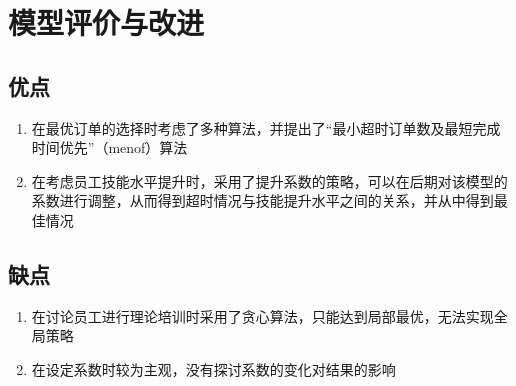 \newpage
\section{模型评价与改进}
\subsection{优点}
\begin{enumerate}
    \item 在最优订单的选择时考虑了多种算法，并提出了“最小超时订单数及最短完成时间优先”（menof）算法

    \item 在考虑员工技能水平提升时，采用了提升系数的策略，可以在后期对该模型的系数进行调整，从而得到超时情况与技能提升水平之间的关系，并从中得到最佳情况
    
\end{enumerate}

\subsection{缺点}
\begin{enumerate}
    \item 在讨论员工进行理论培训时采用了贪心算法，只能达到局部最优，无法实现全局策略
    \item 在设定系数时较为主观，没有探讨系数的变化对结果的影响
    
\end{enumerate}